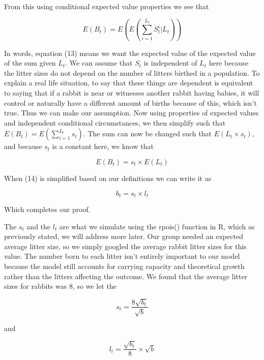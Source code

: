 \documentclass{article}\usepackage[]{graphicx}\usepackage[]{color}
\begin{document}
\noindent From this using conditional expected value properties we see that 

\begin{equation}
E(B_t) = E(E(\sum_{i=1}^{L_t} S_t^i | L_t))
\end{equation}

\noindent In words, equation (13) means we want the expected value of the expected value of the sum given \(L_t\). We can assume that \(S_t\) is independent of \(L_t\) here because the litter sizes do not depend on the number of litters birthed in a population. To explain a real life situation, to say that these things are dependent is equivalent to saying that if a rabbit is near or witnesses another rabbit having babies, it will control or naturally have a different amount of births because of this, which isn't true. Thus we can make our assumption. Now using properties of expected values and independent conditional circumstances, we then simplify such that \(E(B_t) = E(\sum_{i=1}^{L_t} s_t)\). The sum can now be changed such that \(E(L_t \times s_t)\), and because \(s_t\) is a constant here, we know that 

\begin{equation}
E(B_t) = s_t \times E(L_t)
\end{equation}

\noindent When (14) is simplified based on our definitions we can write it as

\begin{equation}
b_t = s_t\times l_t
\end{equation}

\noindent Which completes our proof. 

 The \(s_t\) and the \(l_t\) are what we simulate using the rpois() function in R, which as previously stated, we will address more later. Our group needed an expected average litter size, so we simply googled the average rabbit litter sizes for this value. The number born to each litter isn't entirely important to our model because the model still accounts for carrying capacity and theoretical growth rather than the litters affecting the outcome. We found that the average litter sizes for rabbits was \(8\), so we let the 

\begin{equation}
s_t = \frac{8\sqrt{b_t}}{\sqrt{b}}
\end{equation}

and 

\begin{equation}
l_t = \frac{\sqrt{b_t}}{8}\times \sqrt{b}
\end{equation}
\end{document}
